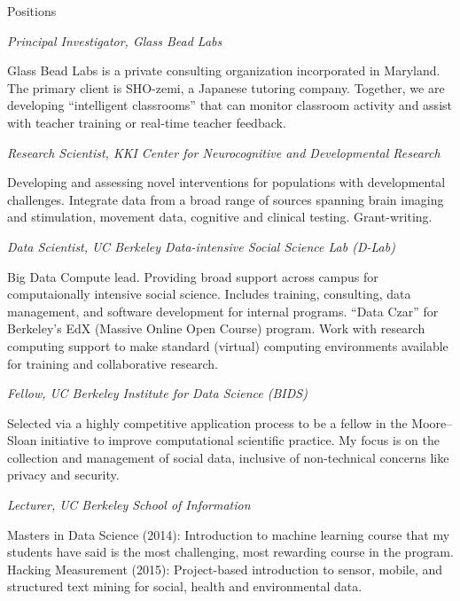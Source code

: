 \begin{rubric}{Positions}

\entry*[2017--current] \emph{Principal Investigator, Glass Bead Labs}
\par Glass Bead Labs is a private consulting organization incorporated in
Maryland. The primary client is SHO-zemi, a Japanese tutoring company.
Together, we are developing ``intelligent classrooms'' that can monitor
classroom activity and assist with teacher training or real-time teacher
feedback.

\entry*[2016--current] \emph{Research Scientist, KKI Center for Neurocognitive
        and Developmental Research}
\par Developing and assessing novel interventions for populations with
developmental challenges. Integrate data from a broad range of sources
spanning brain imaging and stimulation, movement data, cognitive and
clinical testing. Grant-writing.

\entry*[2013--2016] \emph{Data Scientist, UC Berkeley Data-intensive Social
    Science Lab (D-Lab)}
\par Big Data Compute lead. Providing broad support across campus for
computaionally intensive social science. Includes training, consulting, data
management, and software development for internal programs. “Data Czar” for
Berkeley's EdX (Massive Online Open Course) program. Work with research
computing support to make standard (virtual) computing environments available
for training and collaborative research.

\entry*[2014--2016] \emph{Fellow, UC Berkeley Institute for Data Science
    (BIDS)}
\par Selected via a highly competitive application process to be a fellow in the
Moore--Sloan initiative to improve computational scientific practice. My focus
is on the collection and management of social data, inclusive of non-technical
concerns like privacy and security.

\entry*[2014, 2015] \emph{Lecturer, UC Berkeley School of Information} 
\par Masters in Data Science (2014): Introduction to machine learning course
that my students have said is the most challenging, most rewarding course in
the program. Hacking Measurement (2015): Project-based introduction to sensor,
mobile, and structured text mining for social, health and environmental data.

\end{rubric}
